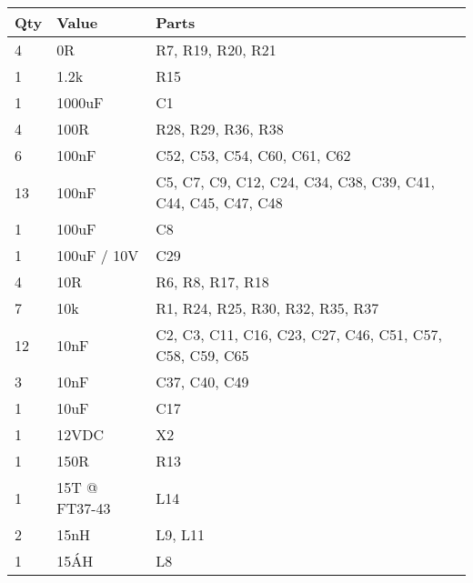 \begin{longtable}{l|l|l}
	\label{long: BOM}
	Qty & Value         & Parts                                                        \\\hline
	
	\endhead
	
	4   & 0R            & R7, R19, R20, R21                                            \\
	1   & 1.2k          & R15                                                          \\
	1   & 1000uF        & C1                                                           \\
	4   & 100R          & R28, R29, R36, R38                                           \\
	6   & 100nF         & C52, C53, C54, C60, C61, C62                                 \\
	13  & 100nF         & C5, C7, C9, C12, C24, C34, C38, C39, C41, C44, C45, C47, C48 \\
	1   & 100uF         & C8                                                           \\
	1   & 100uF / 10V   & C29                                                          \\
	4   & 10R           & R6, R8, R17, R18                                             \\
	7   & 10k           & R1, R24, R25, R30, R32, R35, R37                             \\
	12  & 10nF          & C2, C3, C11, C16, C23, C27, C46, C51, C57, C58, C59, C65     \\
	3   & 10nF          & C37, C40, C49                                                \\
	1   & 10uF          & C17                                                          \\
	1   & 12VDC         & X2                                                           \\
	1   & 150R          & R13                                                          \\
	1   & 15T @ FT37-43 & L14                                                          \\
	2   & 15nH          & L9, L11                                                      \\
	1   & 15ÁH          & L8                                                           \\

\end{longtable}
